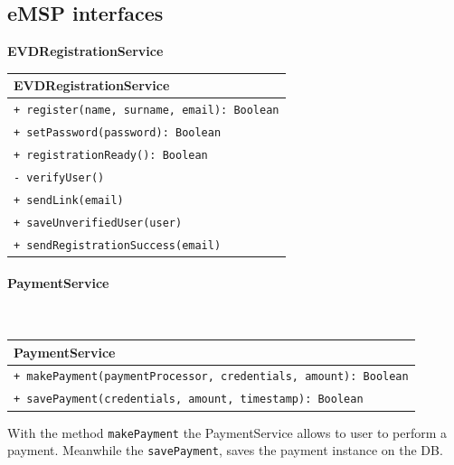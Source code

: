 \subsection{eMSP interfaces}

\textbf{EVDRegistrationService}\\
\begin{table}[H]
    \centering
    \begin{tabular}{|l|}
        \hline
        \textbf{EVDRegistrationService} \\
        \hline
        \verb|+ register(name, surname, email): Boolean|\\
        \verb|+ setPassword(password): Boolean|\\
        \verb|+ registrationReady(): Boolean|\\
        \verb|- verifyUser()|\\
        \verb|+ sendLink(email)|\\
        \verb|+ saveUnverifiedUser(user)|\\
        \verb|+ sendRegistrationSuccess(email)|\\
        \hline
    \end{tabular}
\end{table}

\paragraph{PaymentService}\mbox{}\\
\begin{table}[H]
    \centering
    \begin{tabular}{|l|}
        \hline
        \textbf{PaymentService} \\
        \hline
         \verb|+ makePayment(paymentProcessor, credentials, amount): Boolean|\\
         \verb|+ savePayment(credentials, amount, timestamp): Boolean|\\
         \hline
    \end{tabular}
\end{table}
With the method \verb|makePayment| the PaymentService allows to user to perform a payment. Meanwhile the \verb|savePayment|, saves the payment instance on the DB. 
